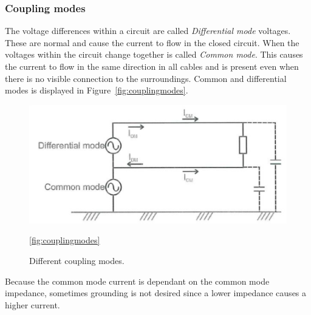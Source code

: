 \subsubsection*{Coupling modes}
The voltage differences within a circuit are called \textit{Differential mode}
voltages. These are normal and cause the current to flow in the closed circuit.
When the voltages within the circuit change together is called \textit{Common
mode}. This causes the current to flow in the same direction in all cables and
is present even when there is no visible connection to the surroundings. Common
and differential modes is displayed in Figure~\ref{fig:couplingmodes}.
\begin{figure}[H]
\centering
\includegraphics[scale=0.7]{./figures/FIG_couplingmodes.png}
\caption{Different coupling modes.}
\ref{fig:couplingmodes}
\end{figure}
Because the common mode current is dependant on the common mode impedance,
sometimes grounding is not desired since a lower impedance causes a higher
current. 


